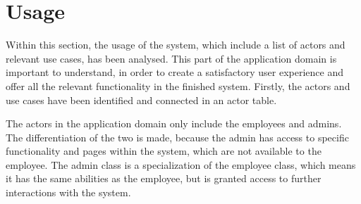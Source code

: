 \section{Usage}\label{sc:usage}
Within this section, the usage of the system, which include a list of actors and relevant use cases, has been analysed. This part of the application domain is important to understand, in order to create a  satisfactory user experience and offer all the relevant functionality in the finished system. Firstly, the actors and use cases have been identified and connected in an actor table.
\par
The actors in the application domain only include the employees and admins. The differentiation of the two is made, because the admin has access to specific functionality and pages within the system, which are not available to the employee. The admin class is a specialization of the employee class, which means it has the same abilities as the employee, but is granted access to further interactions with the system.
